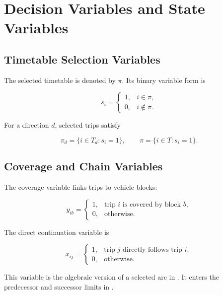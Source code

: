 \section{Decision Variables and State Variables}

\subsection{Timetable Selection Variables}

The selected timetable is denoted by \(\pi\). Its binary variable form is

\begin{equation}
s_i=
\begin{cases}
1, & i\in \pi,\\
0, & i\notin \pi.
\end{cases}
\label{eq:trip-selection-variable}
\end{equation}

For a direction \(d\), selected trips satisfy

\begin{equation}
\pi_d=\{i\in T_d:s_i=1\},
\qquad
\pi=\{i\in T:s_i=1\}.
\label{eq:selected-set-from-variable}
\end{equation}

\subsection{Coverage and Chain Variables}

The coverage variable links trips to vehicle blocks:

\begin{equation}
y_{ib}=
\begin{cases}
1, & \text{trip }i\text{ is covered by block }b,\\
0, & \text{otherwise.}
\end{cases}
\label{eq:coverage-variable}
\end{equation}

The direct continuation variable is

\begin{equation}
x_{ij}=
\begin{cases}
1, & \text{trip }j\text{ directly follows trip }i,\\
0, & \text{otherwise.}
\end{cases}
\label{eq:chain-variable}
\end{equation}

This variable is the algebraic version of a selected arc in
. It enters the predecessor and successor limits
in .


